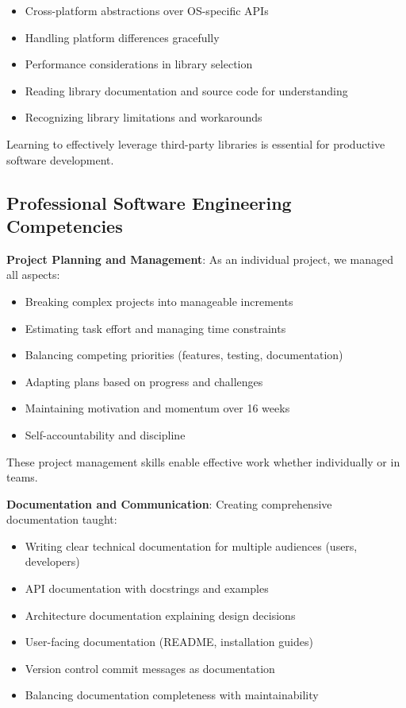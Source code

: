 \documentclass[12pt,a4paper,oneside]{report}
\begin{document}
\begin{itemize}
    \item Cross-platform abstractions over OS-specific APIs
    \item Handling platform differences gracefully
    \item Performance considerations in library selection
    \item Reading library documentation and source code for understanding
    \item Recognizing library limitations and workarounds
\end{itemize}

Learning to effectively leverage third-party libraries is essential for productive software development.

\subsection{Professional Software Engineering Competencies}

\textbf{Project Planning and Management}: As an individual project, we managed all aspects:

\begin{itemize}
    \item Breaking complex projects into manageable increments
    \item Estimating task effort and managing time constraints
    \item Balancing competing priorities (features, testing, documentation)
    \item Adapting plans based on progress and challenges
    \item Maintaining motivation and momentum over 16 weeks
    \item Self-accountability and discipline
\end{itemize}

These project management skills enable effective work whether individually or in teams.

\textbf{Documentation and Communication}: Creating comprehensive documentation taught:

\begin{itemize}
    \item Writing clear technical documentation for multiple audiences (users, developers)
    \item API documentation with docstrings and examples
    \item Architecture documentation explaining design decisions
    \item User-facing documentation (README, installation guides)
    \item Version control commit messages as documentation
    \item Balancing documentation completeness with maintainability
\end{itemize}
\end{document}
